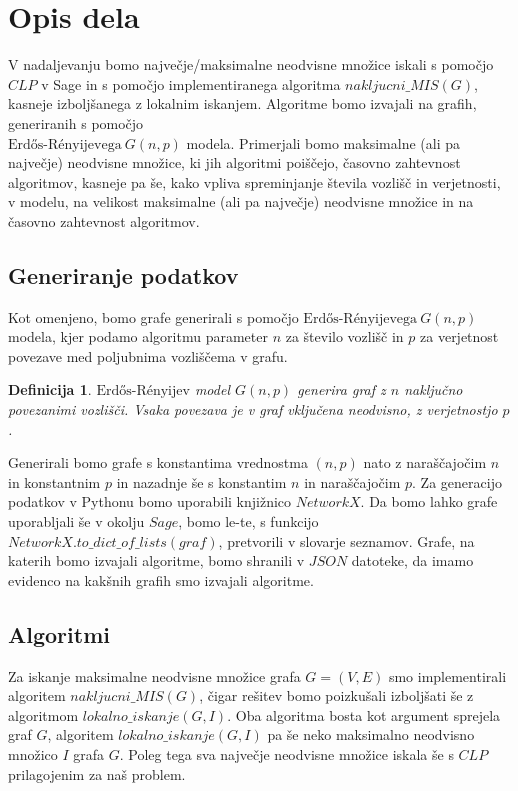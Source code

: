 \documentclass[a4paper, 12pt]{article}
\newtheorem{definicija}{Definicija}
\begin{document}
\newpage

\section{Opis dela}
V nadaljevanju bomo največje/maksimalne neodvisne množice iskali s pomočjo $CLP$ v Sage in s pomočjo implementiranega algoritma $nakljucni\_MIS(G)$,  kasneje izboljšanega z lokalnim
iskanjem. Algoritme bomo izvajali na grafih, generiranih s pomočjo \\
$\text{Erdős-Rényijevega}\ G(n,p)$ modela. Primerjali bomo maksimalne (ali pa največje) neodvisne množice, ki jih algoritmi poiščejo,
časovno zahtevnost algoritmov, kasneje pa še, kako vpliva spreminjanje števila vozlišč in verjetnosti, v modelu, na velikost maksimalne (ali pa največje) neodvisne množice in na
časovno zahtevnost algoritmov.

\subsection{Generiranje podatkov}
Kot omenjeno, bomo grafe generirali s pomočjo $\text{Erdős-Rényijevega}\ G(n,p)$ modela, kjer podamo algoritmu parameter $n$ za število vozlišč in $p$ za verjetnost povezave med poljubnima vozliščema v grafu.

\begin{definicija}
    $\text{Erdős-Rényijev}$ model $G(n, p)$ generira graf z $n$ naključno povezanimi vozlišči. Vsaka povezava je v graf vključena neodvisno, z verjetnostjo $p$.
\end{definicija}

\noindent Generirali bomo grafe s konstantima vrednostma $(n,p)$ nato z naraščajočim $n$ in konstantnim $p$ in nazadnje še s konstantim $n$ in naraščajočim $p$. Za generacijo podatkov v Pythonu bomo uporabili
knjižnico $NetworkX$. Da bomo lahko grafe uporabljali še v okolju $Sage$, bomo le-te, s funkcijo $NetworkX.to\_dict\_of\_lists(graf)$, pretvorili v slovarje seznamov.
Grafe, na katerih bomo izvajali algoritme, bomo shranili v $JSON$ datoteke, da imamo evidenco na kakšnih grafih smo izvajali algoritme.


\subsection{Algoritmi}

Za iskanje maksimalne neodvisne množice grafa $G=(V,E)$ smo implementirali algoritem $nakljucni\_MIS(G)$, čigar rešitev bomo poizkušali izboljšati še z algoritmom $lokalno\_iskanje(G, I)$. Oba
algoritma bosta kot argument sprejela graf $G$, algoritem $lokalno\_iskanje(G, I)$ pa še neko maksimalno neodvisno množico $I$ grafa $G$. Poleg tega sva največje neodvisne množice iskala 
še s $CLP$ prilagojenim za naš problem. 
\end{document}
